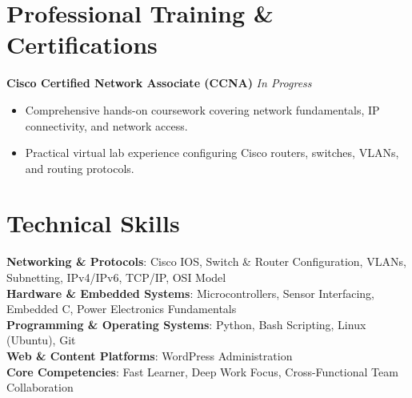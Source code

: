 \documentclass[letterpaper,10pt]{article}
\begin{document}
\section{Professional Training \& Certifications}
  \textbf{Cisco Certified Network Associate (CCNA)} \hfill \textit{In Progress} \\
  \begin{itemize}[leftmargin=0.15in]
      \item Comprehensive hands-on coursework covering network fundamentals, IP connectivity, and network access.
      \item Practical virtual lab experience configuring Cisco routers, switches, VLANs, and routing protocols.
  \end{itemize}

\section{Technical Skills}
 \begin{itemize}[leftmargin=0.15in, label={}]
    \small{\item{
     \textbf{Networking \& Protocols}{: Cisco IOS, Switch \& Router Configuration, VLANs, Subnetting, IPv4/IPv6, TCP/IP, OSI Model} \\ \vspace{2pt}
     \textbf{Hardware \& Embedded Systems}{: Microcontrollers, Sensor Interfacing, Embedded C, Power Electronics Fundamentals} \\ \vspace{2pt}
     \textbf{Programming \& Operating Systems}{: Python, Bash Scripting, Linux (Ubuntu), Git} \\ \vspace{2pt}
     \textbf{Web \& Content Platforms}{: WordPress Administration} \\ \vspace{2pt}
     \textbf{Core Competencies}{: Fast Learner, Deep Work Focus, Cross-Functional Team Collaboration}
    }}
 \end{itemize}
\end{document}
